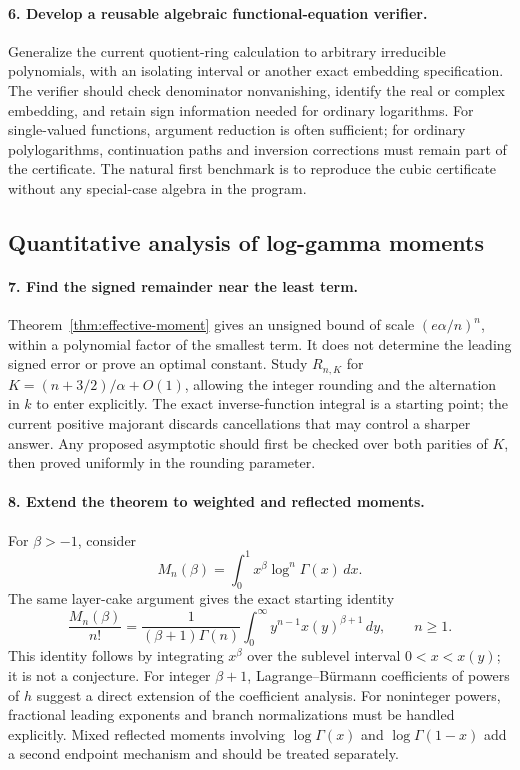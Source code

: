 \paragraph{6. Develop a reusable algebraic functional-equation verifier.}
Generalize the current quotient-ring calculation to arbitrary
irreducible polynomials, with an isolating interval or another exact
embedding specification. The verifier should check denominator
nonvanishing, identify the real or complex embedding, and retain
sign information needed for ordinary logarithms.
For single-valued functions, argument reduction is often sufficient;
for ordinary polylogarithms, continuation paths and inversion
corrections must remain part of the certificate.
The natural first benchmark is to reproduce the cubic certificate
without any special-case algebra in the program.

\subsection{Quantitative analysis of log-gamma moments}

\paragraph{7. Find the signed remainder near the least term.}
Theorem~\ref{thm:effective-moment} gives an unsigned bound of scale
\((e\alpha/n)^n\), within a polynomial factor of the smallest term.
It does not determine the leading signed error or prove an optimal
constant. Study \(R_{n,K}\) for
\(K=(n+3/2)/\alpha+O(1)\), allowing the integer rounding and the
alternation in \(k\) to enter explicitly.
The exact inverse-function integral is a starting point; the current
positive majorant discards cancellations that may control a sharper
answer. Any proposed asymptotic should first be checked over both
parities of \(K\), then proved uniformly in the rounding parameter.

\paragraph{8. Extend the theorem to weighted and reflected moments.}
For \(\beta>-1\), consider
\[
M_n(\beta)=\int_0^1x^\beta\log^n\Gamma(x)\,dx.
\]
The same layer-cake argument gives the exact starting identity
\[
\frac{M_n(\beta)}{n!}
=\frac{1}{(\beta+1)\Gamma(n)}
\int_0^\infty y^{n-1}x(y)^{\beta+1}\,dy,\qquad n\ge1.
\]
This identity follows by integrating \(x^\beta\) over the sublevel
interval \(0<x<x(y)\); it is not a conjecture.
For integer \(\beta+1\), Lagrange--B\"urmann coefficients of powers
of \(h\) suggest a direct extension of the coefficient analysis.
For noninteger powers, fractional leading exponents and branch
normalizations must be handled explicitly.
Mixed reflected moments involving
\(\log\Gamma(x)\) and \(\log\Gamma(1-x)\) add a second endpoint
mechanism and should be treated separately.

